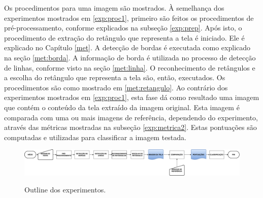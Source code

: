 Os procedimentos para uma imagem são mostrados. À semelhança dos experimentos mostrados em \ref{exp:proc1}, primeiro são feitos os procedimentos de pré-processamento, conforme explicados na subseção \ref{exp:prep}. Após isto, o procedimento de extração do retângulo que representa a tela é iniciado. Ele é explicado no Capítulo \ref{met}. A detecção de bordas é executada como explicado na seção \ref{met:borda}. A informação de borda é utilizada no processo de detecção de linhas, conforme visto na seção \ref{met:linha}. O reconhecimento de retângulos e a escolha do retângulo que representa a tela são, então, executados. Os procedimentos são como mostrado em \ref{met:retangulo}. Ao contrário dos experimentos mostrados em \ref{exp:proc1}, esta fase dá como resultado uma imagem que contém o conteúdo da tela extraído da imagem original. Esta imagem é comparada com uma ou mais imagens de referência, dependendo do experimento, através das métricas mostradas na subseção \ref{exp:metrica2}. Estas pontuações são computadas e utilizadas para classificar a imagem testada. 

\begin{figure} [h]
\centering
\includegraphics[width = \textwidth]{figuras/exp2.pdf} \label{figexp2}
\caption{Outline dos experimentos.}
\end{figure} 


